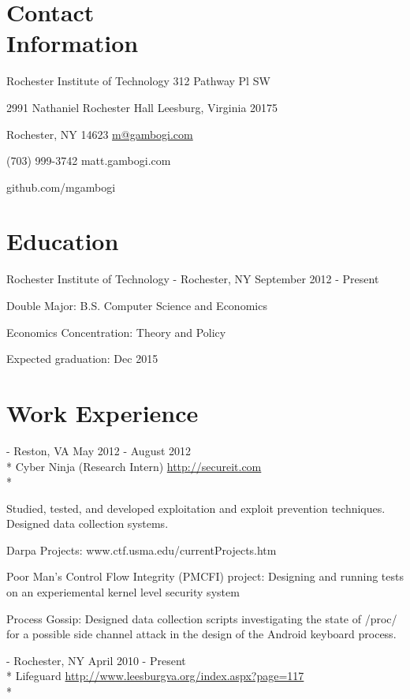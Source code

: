 \documentclass[letter,margin,line]{resume}
\newcommand{\rurl}[1]{\hfill {\footnotesize \url{#1}}}
\newcommand{\rdate}[1]{\hfill {\small #1}}
\renewcommand{\employer}[5]{\item[#1] - #2 \rdate{#3} \\* #4 \rurl{#5} \\*}
\begin{document}
\begin{resume}
\section{\mysidestyle Contact \\ Information} \vspace{2mm}
	\begin{asparablank}
		\item Rochester Institute of Technology \hfill 312 Pathway Pl SW
		\item 2991 Nathaniel Rochester Hall \hfill Leesburg, Virginia 20175
		\item Rochester, NY 14623 \hfill
		\href{mailto:m@gambogi.com}{m@gambogi.com}
		\item (703) 999-3742 \hfill {matt.gambogi.com}
		\item \hfill github.com/mgambogi
	\end{asparablank}

\section{\mysidestyle Education}
	\begin{compactdesc}
		\item[Rochester Institute of Technology] - Rochester, NY \rdate{September 2012 - Present}
		\begin{compactitem} { \small
			\item Double Major: B.S. Computer Science and Economics 
			\item Economics Concentration: Theory and Policy
			\item Expected graduation: Dec 2015
		} \end{compactitem}
	\end{compactdesc}

\section{\mysidestyle Work Experience}
	\begin{asparadesc}
		\employer{SecureIT}{Reston, VA}{May 2012 - August 2012}{Cyber Ninja (Research Intern)}{http://secureit.com}

		\small
		Studied, tested, and developed exploitation and exploit prevention techniques. Designed data collection systems.
		\item Darpa Projects: \hfill www.ctf.usma.edu/currentProjects.htm
			\item Poor Man’s Control Flow Integrity (PMCFI) project: Designing and running tests on an experiemental kernel level security system
			\item Process Gossip: Designed data collection scripts investigating the state of /proc/ for a possible side channel attack in the design of the Android keyboard process.
		\normalsize
		\\
        \employer{Town of Leesburg, Parks and Recreation}{Rochester, NY}{April 2010 - Present}{Lifeguard}{http://www.leesburgva.org/index.aspx?page=117}


\end{asparadesc}
\end{resume}
\end{document}
